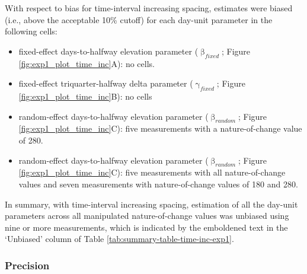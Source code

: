 \documentclass[
12pt, %
twoside,
english]{guelphthesis}
\begin{document}
With respect to bias for time-interval increasing spacing, estimates were biased (i.e., above the acceptable 10\% cutoff) for each day-unit parameter in the following cells:
\begin{itemize}
\tightlist
\item
  fixed-effect days-to-halfway elevation parameter (\(\upbeta_{fixed}\); Figure \ref{fig:exp1_plot_time_inc}A): no cells.
\item
  fixed-effect triquarter-halfway delta parameter (\(\upgamma_{fixed}\); Figure \ref{fig:exp1_plot_time_inc}B): no cells
\item
  random-effect days-to-halfway elevation parameter (\(\upbeta_{random}\); Figure \ref{fig:exp1_plot_time_inc}C): five measurements with a nature-of-change value of 280.
\item
  random-effect days-to-halfway elevation parameter (\(\upbeta_{random}\); Figure \ref{fig:exp1_plot_time_inc}C): five measurements with all nature-of-change values and seven measurements with nature-of-change values of 180 and 280.
\end{itemize}
In summary, with time-interval increasing spacing, estimation of all the day-unit parameters across all manipulated nature-of-change values was unbiased using nine or more measurements, which is indicated by the emboldened text in the `Unbiased' column of Table \ref{tab:summary-table-time-inc-exp1}.

\hypertarget{precision-time-inc-exp1}{%
\subsubsection{Precision}\label{precision-time-inc-exp1}}
\end{document}
